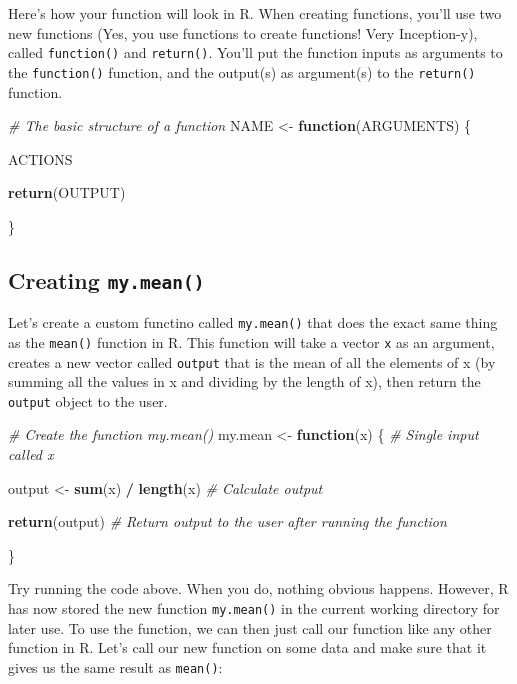 \documentclass[]{book}
\newenvironment{Shaded}{\begin{snugshade}}{\end{snugshade}}
\newcommand{\KeywordTok}[1]{\textcolor[rgb]{0.13,0.29,0.53}{\textbf{#1}}}
\newcommand{\StringTok}[1]{\textcolor[rgb]{0.31,0.60,0.02}{#1}}
\newcommand{\CommentTok}[1]{\textcolor[rgb]{0.56,0.35,0.01}{\textit{#1}}}
\newcommand{\ControlFlowTok}[1]{\textcolor[rgb]{0.13,0.29,0.53}{\textbf{#1}}}
\newcommand{\OperatorTok}[1]{\textcolor[rgb]{0.81,0.36,0.00}{\textbf{#1}}}
\newcommand{\NormalTok}[1]{#1}
\theoremstyle{definition}
\theoremstyle{definition}
\theoremstyle{remark}
\begin{document}
Here's how your function will look in R. When creating functions, you'll
use two new functions (Yes, you use functions to create functions! Very
Inception-y), called \texttt{function()} and \texttt{return()}. You'll
put the function inputs as arguments to the \texttt{function()}
function, and the output(s) as argument(s) to the \texttt{return()}
function.

\begin{Shaded}
\begin{Highlighting}[]
\CommentTok{# The basic structure of a function}
\NormalTok{NAME <-}\StringTok{ }\ControlFlowTok{function}\NormalTok{(ARGUMENTS) \{}

\NormalTok{  ACTIONS}

  \KeywordTok{return}\NormalTok{(OUTPUT)}

\NormalTok{\}}
\end{Highlighting}
\end{Shaded}

\subsection{\texorpdfstring{Creating
\texttt{my.mean()}}{Creating my.mean()}}\label{creating-my.mean}

Let's create a custom functino called \texttt{my.mean()} that does the
exact same thing as the \texttt{mean()} function in R. This function
will take a vector \texttt{x} as an argument, creates a new vector
called \texttt{output} that is the mean of all the elements of x (by
summing all the values in x and dividing by the length of x), then
return the \texttt{output} object to the user.

\begin{Shaded}
\begin{Highlighting}[]
\CommentTok{# Create the function my.mean()}
\NormalTok{my.mean <-}\StringTok{ }\ControlFlowTok{function}\NormalTok{(x) \{   }\CommentTok{# Single input called x}

\NormalTok{  output <-}\StringTok{ }\KeywordTok{sum}\NormalTok{(x) }\OperatorTok{/}\StringTok{ }\KeywordTok{length}\NormalTok{(x) }\CommentTok{# Calculate output}

\KeywordTok{return}\NormalTok{(output)  }\CommentTok{# Return output to the user after running the function}

\NormalTok{\}}
\end{Highlighting}
\end{Shaded}

Try running the code above. When you do, nothing obvious happens.
However, R has now stored the new function \texttt{my.mean()} in the
current working directory for later use. To use the function, we can
then just call our function like any other function in R. Let's call our
new function on some data and make sure that it gives us the same result
as \texttt{mean()}:
\end{document}
